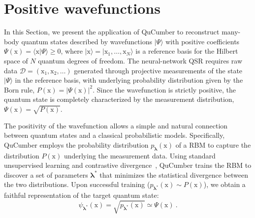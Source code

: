 \documentclass[submission, Phys]{SciPost}
\begin{document}



\section{Positive wavefunctions}
\label{sec::positive}
In this Section, we present the application of QuCumber to reconstruct many-body quantum states described by wavefunctions $|\Psi\rangle$ with positive coefficients $\Psi(\bm{\mathrm{x}})=\langle\bm{\mathrm{x}}|\Psi\rangle \ge0$, where $|\bm{\mathrm{x}}\rangle=|\mathrm{x}_1,\dots,\mathrm{x}_N\rangle$ is a reference basis for the Hilbert space of $N$ quantum degrees of freedom. The neural-network QSR requires raw data $\mathcal{D}=(\bm{\mathrm{x}}_1,\bm{\mathrm{x}}_2,\dots)$ generated through projective measurements of the state $|\Psi\rangle$ in the reference basis, with underlying probability distribution given by the Born rule, $P(\bm{\mathrm{x}})=|\Psi(\bm{\mathrm{x}})|^2$. Since the wavefunction is strictly positive, the quantum state is completely characterized by the measurement distribution, $\Psi(\bm{\mathrm{x}})=\sqrt{P(\bm{\mathrm{x}})}$. 

The positivity of the wavefunction allows a simple and natural connection between quantum states and a classical probabilistic models. Specifically, QuCumber employs the probability distribution $p_{\bm{\lambda}}(\bm{\mathrm{x}})$ of a RBM to capture the distribution $P(\bm{\mathrm{x}})$ underlying the measurement data. Using standard unsupervised learning and contrastive divergence~\cite{hinton2002training}, QuCumber trains the RBM to discover a set of parameters $\bm{\lambda}^*$ that minimizes the statistical divergence between the two distributions. Upon successful training ($p_{\bm{\lambda}^*}(\bm{\mathrm{x}})\sim P(\bm{\mathrm{x}})$), we obtain a faithful representation of the target quantum state:
\begin{equation}
\psi_{\bm{\lambda}^*}(\bm{\mathrm{x}})= \sqrt{p_{\bm{\lambda}^*}(\bm{\mathrm{x}})}
\simeq\Psi(\bm{\mathrm{x}})\:.
\label{wfpd}
\end{equation} 
\end{document}

